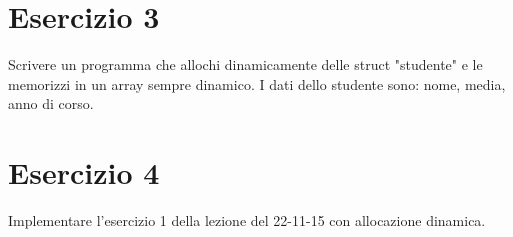 \documentclass{article}
\begin{document}
    \section*{Esercizio 3}

    Scrivere un programma che allochi dinamicamente delle struct "studente" e le memorizzi in un array sempre dinamico. I dati dello studente sono: nome, media, anno di corso. 

    \section*{Esercizio 4}

    Implementare l'esercizio 1 della lezione del 22-11-15 con allocazione dinamica.
\end{document}
